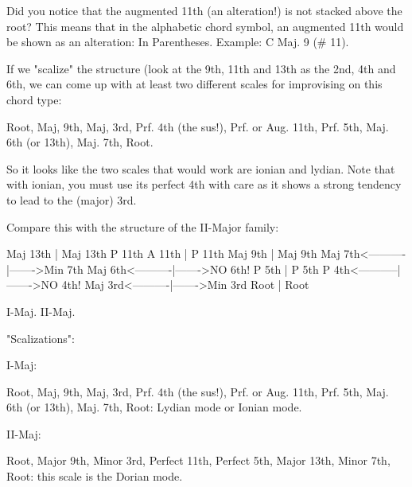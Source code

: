 Did you notice that the augmented 11th (an alteration!) is not stacked 
above the root? This means that in the alphabetic chord symbol, an 
augmented 11th would be shown as an alteration: In Parentheses. Example:
C Maj. 9 (\# 11).

If we "scalize" the structure (look at the 9th, 11th and 13th as the 2nd, 
4th and 6th, we can come up with at least two different scales for 
improvising on this chord type:

Root, Maj, 9th, Maj, 3rd, Prf. 4th (the sus!), Prf. or Aug. 11th, 
Prf. 5th, Maj. 6th (or 13th), Maj. 7th, Root.

So it looks like the two scales that would work are ionian and lydian. 
Note that with ionian, you must use its perfect 4th with care as it shows 
a strong tendency to lead to the (major) 3rd.

Compare this with the structure of the II-Major family:

        Maj 13th          |        Maj 13th
         P 11th   A 11th  |         P 11th
        Maj 9th           |        Maj 9th
        Maj 7th<----------|------->Min 7th 
        Maj 6th<----------|------->NO 6th!
         P 5th            |         P 5th
         P 4th<-----------|------->NO 4th!
        Maj 3rd<----------|------->Min 3rd
         Root             |         Root

        I-Maj.                     II-Maj.

"Scalizations":

I-Maj:

Root, Maj, 9th, Maj, 3rd, Prf. 4th (the sus!), Prf. or Aug. 11th, 
Prf. 5th, Maj. 6th (or 13th), Maj. 7th, Root: Lydian mode or Ionian mode.

II-Maj:

Root, Major 9th, Minor 3rd, Perfect 11th, Perfect 5th, 
Major 13th, Minor 7th, Root: this scale is the Dorian mode.

